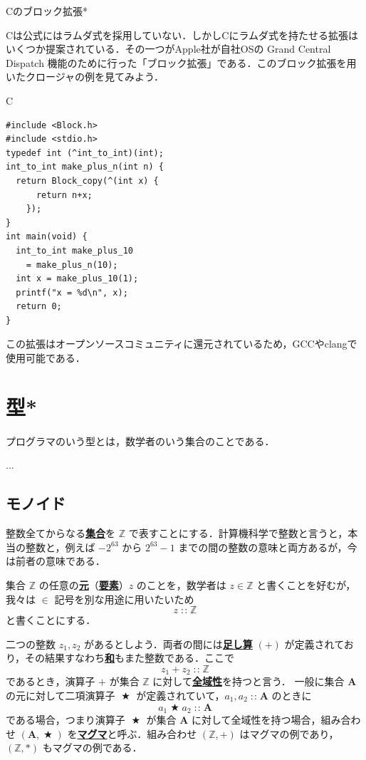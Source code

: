 \documentclass[a4paper,twocolumn]{jsbook}
\newcommand{\programminglanguage}[1]{\textsf{#1}}
\newcommand{\clang}{\programminglanguage{C}}
\newenvironment{leader}{\begingroup\gt}{\endgroup}
\newenvironment{note}[1]{\begin{boxnote}\begin{center}#1\end{center}}{\end{boxnote}}
\newcommand{\keyword}[1]{{\underline{\textbf{#1}}}}
\newenvironment{ccode}{\begin{itembox}[r]{\clang}}{\end{itembox}}
\DeclareMathOperator{\mBinOp}{\bigstar}
\DeclareMathOperator{\mIn}{{:\!:}}
\newcommand{\mSet}[1]{\mathbf{#1}}
\newcommand{\mSpecialSet}[1]{\mathbb{#1}} %
\newcommand{\mZSet}{\mSpecialSet{Z}}
\newcommand{\mTupleWith}[1]{\left(#1\right)}
\begin{document}
\begin{note}{\clang のブロック拡張*}
\clang は公式にはラムダ式を採用していない．しかし\clang にラムダ式を持たせる拡張はいくつか提案されている．その一つがApple社が自社OSの Grand Central Dispatch 機能のために行った「ブロック拡張」である．このブロック拡張を用いたクロージャの例を見てみよう．

\begin{ccode}
\begin{verbatim}
#include <Block.h>
#include <stdio.h>
typedef int (^int_to_int)(int);
int_to_int make_plus_n(int n) {
  return Block_copy(^(int x) {
      return n+x;
    });
}
int main(void) {
  int_to_int make_plus_10
    = make_plus_n(10);
  int x = make_plus_10(1);
  printf("x = %d\n", x);
  return 0;
}
\end{verbatim}
\end{ccode}

この拡張はオープンソースコミュニティに還元されているため，GCCやclangで使用可能である．
\end{note}
\chapter{型*}

\begin{leader}
プログラマのいう型とは，数学者のいう集合のことである．

...
\end{leader}

\section{モノイド}

整数全てからなる\keyword{集合}を $\mZSet$ で表すことにする．計算機科学で整数と言うと，本当の整数と，例えば $-2^{63}$ から $2^{63}-1$ までの間の整数の意味と両方あるが，今は前者の意味である．

集合 $\mZSet$ の任意の\keyword{元}（\keyword{要素}）$z$ のことを，数学者は $z\in\mZSet$ と書くことを好むが，我々は $\in$ 記号を別な用途に用いたいため
\begin{equation}
\label{eq:totality}
z\mIn\mZSet
\end{equation}
と書くことにする．

二つの整数 $z_1,z_2$ があるとしよう．両者の間には\keyword{足し算} $(+)$ が定義されており，その結果すなわち\keyword{和}もまた整数である．ここで
\begin{equation}
z_1+z_2\mIn\mZSet
\end{equation}
であるとき，演算子 $+$ が集合 $\mZSet$ に対して\keyword{全域性}を持つと言う．
一般に集合 $\mSet{A}$ の元に対して二項演算子 $\mBinOp$ が定義されていて，$a_1,a_2\mIn\mSet{A}$ のときに
\begin{equation}
\label{eq:totality}
a_1\mBinOp a_2\mIn\mSet{A}
\end{equation}
である場合，つまり演算子 $\mBinOp$ が集合 $\mSet{A}$ に対して全域性を持つ場合，組み合わせ $\mTupleWith{\mSet{A},\mBinOp}$ を\keyword{マグマ}と呼ぶ．組み合わせ $\mTupleWith{\mZSet,+}$ はマグマの例であり，$\mTupleWith{\mZSet,*}$ もマグマの例である．
\end{document}
